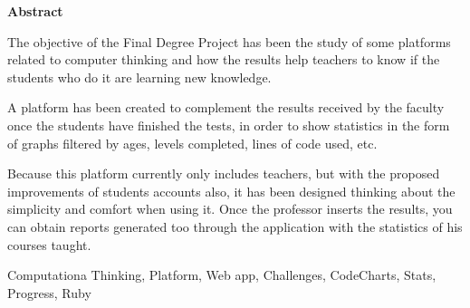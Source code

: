 \documentclass[spanish,a4paper,14pt,oneside]{extreport}
\newenvironment{summary}
  {\par\noindent\begin{center}\textbf{Abstract}\end{center}\begin{itshape}\par\noindent}
  {\end{itshape}}
\newenvironment{keywords}
  {\begin{list}{}{\setlength{\leftmargin}{1em}}\item[\hskip\labelsep \bfseries Keywords:]}
  {\end{list}}
\begin{document}
  \newpage  %
  \begin{summary}
  {\em
   
    The objective of the Final Degree Project has been the study of some platforms related to computer thinking and how the results help teachers to know if
    the students who do it are learning new knowledge.

    A platform has been created  to complement the results received by the faculty once the students have finished the tests, in order to show statistics in the form of graphs
    filtered by ages, levels completed, lines of code used, etc.
    
    Because this platform currently only includes teachers, but with the proposed improvements of students accounts also, it has been designed thinking about the simplicity and 
    comfort when using it. Once the professor inserts the results, you can obtain reports generated too through the application with the statistics of his courses taught.
  }
   
  \begin{keywords}
  Computationa Thinking, Platform, Web app, Challenges, CodeCharts, Stats, Progress, Ruby
  \end{keywords}
   
  \end{summary}
   
  \newpage{\pagestyle{empty}}
  \thispagestyle{empty}
   
   
   
  \pagestyle{myheadings} %
   
  \renewcommand{\thepage}{\roman{page}}
  \setcounter{page}{1}
   
   
\end{document}
